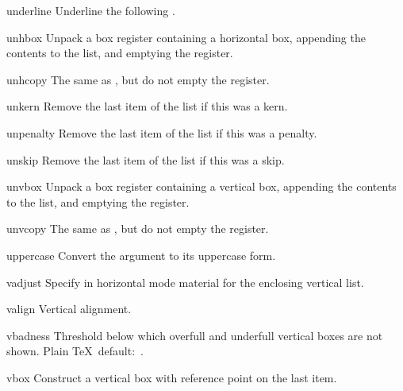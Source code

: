 \item underline
      Underline the following .

\item unhbox
 \alt
      Unpack a box register containing a horizontal box,  
      appending the contents to the list, and emptying the register. 

\item unhcopy
 \alt
      The same as , but do not empty the register. 

\item unkern
      Remove the last item of the list if this was a kern.

\item unpenalty
      Remove the last item of the list if this was a penalty.

\item unskip
      Remove the last item of the list if this was a skip.

\item unvbox
 \alt
      Unpack a box register containing a vertical box, 
      appending the contents to the list, and emptying the register. 

\item unvcopy
 \alt
      The same as , but do not empty the register. 

\item uppercase
      Convert the argument to its uppercase form.

\item vadjust\lb{}\rb
      Specify in horizontal mode material for the enclosing vertical list.

\item valign\lb{}\rb
      Vertical alignment.   

\item vbadness
      Threshold below which overfull and underfull vertical boxes 
      are not shown.
      Plain \TeX\ default:~.

\item vbox\lb{}\rb
      Construct a vertical box with reference point on the last item. 

